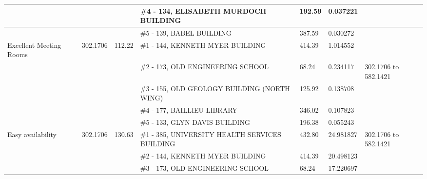 \begin{table}[H]
{\begin{tabular}{|l|l|l|l|l|l|l|}
                         &                          &                                   & \#4 - 134, ELISABETH MURDOCH BUILDING                       & 192.59        & 0.037221        &                                    \\ \hline
                         &                          &                                   & \#5 - 139, BABEL BUILDING                                   & 387.59        & 0.030272        &                                    \\ \hline
Excellent Meeting Rooms  & 302.1706                 & 112.22                            & \#1 - 144, KENNETH MYER BUILDING                            & 414.39        & 1.014552        &                                    \\ \hline
                         &                          &                                   & \#2 - 173, OLD ENGINEERING SCHOOL                           & 68.24         & 0.234117        & 302.1706 to 582.1421               \\ \hline
                         &                          &                                   & \#3 - 155, OLD GEOLOGY BUILDING (NORTH WING)                & 125.92        & 0.138708        &                                    \\ \hline
                         &                          &                                   & \#4 - 177, BAILLIEU LIBRARY                                 & 346.02        & 0.107823        &                                    \\ \hline
                         &                          &                                   & \#5 - 133, GLYN DAVIS BUILDING                              & 196.38        & 0.055243        &                                    \\ \hline
Easy availability        & 302.1706                 & 130.63                            & \#1 - 385, UNIVERSITY HEALTH SERVICES BUILDING              & 432.80        & 24.981827       & 302.1706 to 582.1421               \\ \hline
                         &                          &                                   & \#2 - 144, KENNETH MYER BUILDING                            & 414.39        & 20.498123       &                                    \\ \hline
                         &                          &                                   & \#3 - 173, OLD ENGINEERING SCHOOL                           & 68.24         & 17.220697       &                                    \\ \hline

\end{tabular}}
\end{table}
